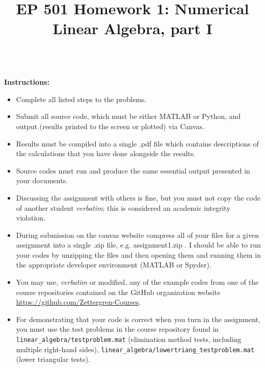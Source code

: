 \documentclass{article}
\begin{document}
\title{EP 501 Homework 1:  Numerical Linear Algebra, part I}

\maketitle

~\\
\textbf{Instructions:}  
\begin{itemize}
  \item Complete all listed steps to the problems.
  \item Submit all source code, which must be either MATLAB or Python, and output (results printed to the screen or plotted) via Canvas.  
  \item Results must be compiled into a single .pdf file which contains descriptions of the calculations that you have done alongside the results.  
  \item Source codes must run and produce the same essential output presented in your documents.  
  \item Discussing the assignment with others is fine, but you must not copy the code of another student \emph{verbatim}; this is considered an academic integrity violation.  
  \item During submission on the canvas website compress all of your files for a given assignment into a single .zip file, e.g. \textsf{assignment1.zip} .  I should be able to run your codes by unzipping the files and then opening them and running them in the appropriate developer environment (MATLAB or Spyder).  
  \item You may use, \emph{verbatim} or modified, any of the example codes from one of the course repositories contained on the GitHub organization website  \url{https://github.com/Zettergren-Courses}.
  \item For demonstrating that your code is correct when you turn in the assignment, you must use the test problems in the course repository found in \texttt{linear\_algebra/testproblem.mat} (elimination method tests, including multiple right-hand sides), \texttt{linear\_algebra/lowertriang\_testproblem.mat} (lower triangular tests).
\end{itemize}
\end{document}
